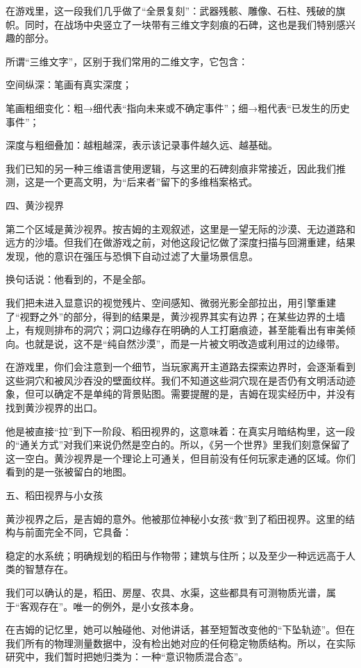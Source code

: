 在游戏里，这一段我们几乎做了“全景复刻”：武器残骸、雕像、石柱、残破的旗帜。同时，在战场中央竖立了一块带有三维文字刻痕的石碑，这也是我们特别感兴趣的部分。

所谓“三维文字”，区别于我们常用的二维文字，它包含：

空间纵深：笔画有真实深度；

笔画粗细变化：粗→细代表“指向未来或不确定事件”；细→粗代表“已发生的历史事件”；

深度与粗细叠加：越粗越深，表示该记录事件越久远、越基础。

我们已知的另一种三维语言使用逻辑，与这里的石碑刻痕非常接近，因此我们推测，这是一个更高文明，为“后来者”留下的多维档案格式。

四、黄沙视界

第二个区域是黄沙视界。按吉姆的主观叙述，这里是一望无际的沙漠、无边道路和远方的沙墙。但我们在做游戏之前，对他这段记忆做了深度扫描与回溯重建，结果发现，他的意识在强压与恐惧下自动过滤了大量场景信息。

换句话说：他看到的，不是全部。

我们把未进入显意识的视觉残片、空间感知、微弱光影全部拉出，用引擎重建了“视野之外”的部分，得到的结果是，黄沙视界其实有边界；在某些边界的土墙上，有规则排布的洞穴；洞口边缘存在明确的人工打磨痕迹，甚至能看出有审美倾向。也就是说，这不是“纯自然沙漠”，而是一片被文明改造或利用过的边缘带。

在游戏里，你们会注意到一个细节，当玩家离开主道路去探索边界时，会逐渐看到这些洞穴和被风沙吞没的壁面纹样。我们不知道这些洞穴现在是否仍有文明活动迹象，但可以确定不是单纯的背景贴图。需要提醒的是，吉姆在现实经历中，并没有找到黄沙视界的出口。

他是被直接“拉”到下一阶段、稻田视界的，这意味着：在真实月暗结构里，这一段的“通关方式”对我们来说仍然是空白的。所以，《另一个世界》里我们刻意保留了这一空白。黄沙视界是一个理论上可通关，但目前没有任何玩家走通的区域。你们看到的是一张被留白的地图。

五、稻田视界与小女孩

黄沙视界之后，是吉姆的意外。他被那位神秘小女孩“救”到了稻田视界。这里的结构与前面完全不同，它具备：

稳定的水系统；明确规划的稻田与作物带；建筑与住所；以及至少一种远远高于人类的智慧存在。

我们可以确认的是，稻田、房屋、农具、水渠，这些都具有可测物质光谱，属于“客观存在”。唯一的例外，是小女孩本身。

在吉姆的记忆里，她可以触碰他、对他讲话，甚至短暂改变他的“下坠轨迹”。但在我们所有的物理测量数据中，没有检出她对应的任何稳定物质结构。所以，在实际研究中，我们暂时把她归类为：一种“意识物质混合态”。

